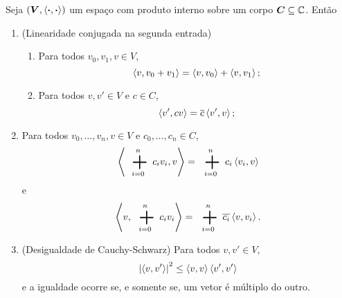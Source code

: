 \begin{proposition}
Seja $(\bm V,\left\langle{\bm{\cdot}},{\bm{\cdot}}\right\rangle)$ um espaço com produto interno sobre um corpo $\bm C \subseteq \mathbb{C}$. Então
	\begin{enumerate}
	\item (Linearidade conjugada na segunda entrada)
		\begin{enumerate}
		\item Para todos $v_0,v_1,v \in V$,
			\begin{equation*}
			\left\langle{v},{v_0+v_1}\right\rangle = \left\langle{v},{v_0}\right\rangle + \left\langle{v},{v_1}\right\rangle;
			\end{equation*}
		\item Para todos $v,v' \in V$ e $c \in C$,
			\begin{equation*}
			\left\langle{v'},{cv}\right\rangle = \overline{c}\left\langle{v'},{v}\right\rangle;
			\end{equation*}
		\end{enumerate}
	\item Para todos $v_0,\ldots,v_n,v \in V$ e $c_0,\ldots,c_n \in C$,
		\begin{equation*}
		\inte{\sum_{i=0}^n c_iv_i}{v} = \sum_{i=0}^n c_i\inte{v_i}{v}
		\end{equation*}
e
		\begin{equation*}
		\inte{v}{\sum_{i=0}^n c_iv_i} = \sum_{i=0}^n \conju{c_i}\inte{v}{v_i}.
		\end{equation*}
	\item (Desigualdade de Cauchy-Schwarz) Para todos $v,v' \in V$,
		\begin{equation*}
		\left\vert{\left\langle{v},{v'}\right\rangle}\right\vert^2 \leq \left\langle{v},{v}\right\rangle\left\langle{v'},{v'}\right\rangle
		\end{equation*}
		e a igualdade ocorre se, e somente se, um vetor é múltiplo do outro.
		\end{enumerate}
\end{proposition}
